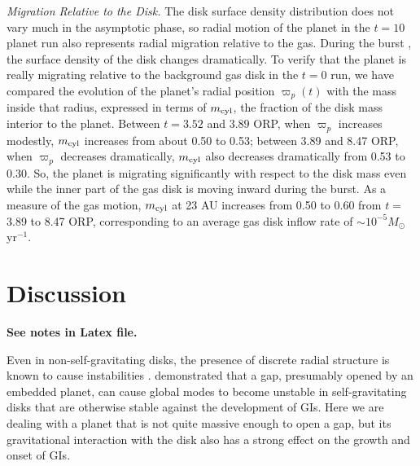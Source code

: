 \documentclass[12pt,manuscript,authoryear]{aastex}
\begin{document}
{\it Migration Relative to the Disk.} The disk surface density distribution does not vary much in the asymptotic phase, so radial motion of the planet in the $t = 10$ planet run also represents radial migration relative to the gas. During the burst \citep[e.g.,][]{boley2006}, the surface density of the disk changes dramatically. To verify that the planet is really migrating relative to the background gas disk in the $t = 0$ run, we have compared the evolution of the planet's radial position $\varpi_p(t)$ with the mass inside that radius, expressed in terms of $m_{\rm cyl}$, the fraction of the disk mass interior to the planet. Between $t = 3.52$ and $3.89$ ORP, when $\varpi_p$ increases modestly, $m_{\rm cyl}$ increases from about 0.50 to 0.53; between 3.89 and 8.47 ORP, when $\varpi_p$ decreases dramatically, $m_{\rm cyl}$ also decreases dramatically from 0.53 to 0.30. So, the planet is migrating significantly with respect to the disk mass even while the inner part of the gas disk is moving inward during the burst. As a measure of the gas motion, $m_{\rm cyl}$ at 23 AU increases from 0.50 to 0.60 from $t =$ 3.89 to 8.47 ORP, corresponding to an average gas disk inflow rate of $\sim 10^{-5} M_{\odot}$ yr$^{-1}$.

\section{Discussion}

{\bf See notes in Latex file.}

Even in non-self-gravitating disks, the presence of discrete radial structure is known to cause instabilities \citep{li1999,li2000}. \citet{meschiari2008} demonstrated that a gap, presumably opened by an embedded planet, can cause global modes to become unstable in self-gravitating disks that are otherwise stable against the development of GIs. Here we are dealing with a planet that is not quite massive enough to open a gap, but its gravitational interaction with the disk also has a strong effect on the growth and onset of GIs.
 
\end{document}
